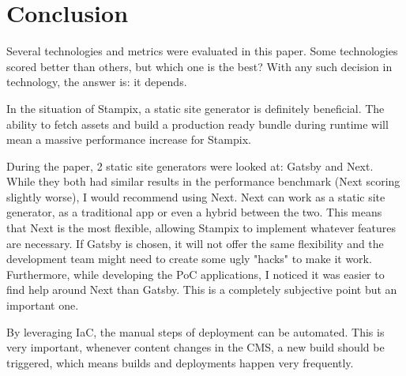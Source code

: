\chapter{Conclusion} %

\label{Chapter6} 

Several technologies and metrics were evaluated in this paper. 
Some technologies scored better than others, but which one is the best? 
With any such decision in technology, the answer is: it depends.

In the situation of Stampix, a static site generator is definitely beneficial. 
The ability to fetch assets and build a production ready bundle during runtime will mean a massive performance increase for Stampix.

During the paper, 2 static site generators were looked at: Gatsby and Next. 
While they both had similar results in the performance benchmark (Next scoring slightly worse), I would recommend using Next.
Next can work as a static site generator, as a traditional app or even a hybrid between the two.
This means that Next is the most flexible, allowing Stampix to implement whatever features are necessary.
If Gatsby is chosen, it will not offer the same flexibility and the development team might need to create some ugly "hacks" to make it work.
Furthermore, while developing the PoC applications, I noticed it was easier to find help around Next than Gatsby.
This is a completely subjective point but an important one.

By leveraging IaC, the manual steps of deployment can be automated. 
This is very important, whenever content changes in the CMS, a new build should be triggered, which means builds and deployments happen very frequently.
